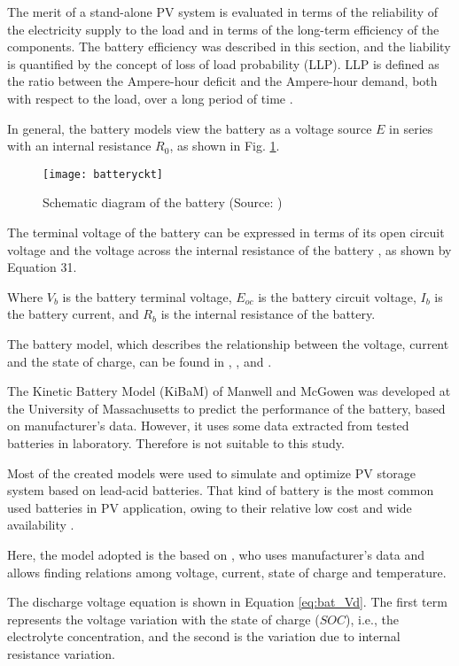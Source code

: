 The merit of a stand-alone PV system is evaluated in terms of the reliability of the electricity supply to the load and in terms of the long-term efficiency of the components. The battery efficiency was described in this section, and the liability is quantified by the concept of loss of load probability (LLP). LLP is defined as the ratio between the Ampere-hour deficit and the Ampere-hour demand, both with respect to the load, over a long period of time \cite{Copetti}. 

In general, the battery models view the battery as a voltage source $ E $ in series with an internal resistance $ R_{0} $, as shown in Fig. \ref{fig:batteryckt}. 

\begin{figure}[h]
\texttt{[image: batteryckt]}
\centering
\caption{Schematic diagram of the battery (Source: \cite{Hansen})}
\label{fig:batteryckt}
\end{figure}


The terminal voltage of the battery can be expressed in terms of its open circuit voltage and the voltage across the internal resistance of the battery \cite{Sukamongkol}, as shown by Equation 31.  

Where $ V_{b} $ is the battery terminal voltage, $ E_{oc} $ is the battery circuit voltage, $ I_{b} $ is the battery current, and $ R_{b} $ is the internal resistance of the battery.

The battery model, which describes the relationship between the voltage, current and the state of charge, can be found in \cite{Copetti}, \cite{Manwell93}, and \cite{Manwell94}.  

The Kinetic Battery Model (KiBaM) of Manwell and McGowen \cite{Manwell93} was developed at the University of Massachusetts to predict the performance of the battery, based on manufacturer's data. However, it uses some data extracted from tested batteries in laboratory. Therefore is not suitable to this study. 

Most of the created models were used to simulate and optimize PV storage system based on lead-acid batteries. That kind of battery is the most common used batteries in PV application, owing to their relative low cost and wide availability \cite{Copetti}. 

Here, the model adopted is the based on \cite{Copetti}, who uses manufacturer's data and allows finding relations among voltage, current, state of charge and temperature. 

The discharge voltage equation is shown in Equation \ref{eq:bat_Vd}. The first term represents the voltage variation with the state of charge ($ SOC $), i.e., the electrolyte concentration, and the second is the variation due to internal resistance variation.

